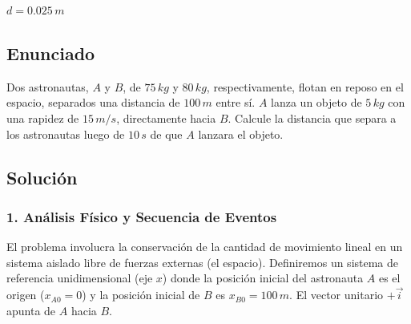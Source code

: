 \documentclass[12pt, a4paper]{article}
\begin{document}
\begin{tcolorbox}[colback=green!5!white, colframe=green!50!black, title=Respuesta Final]
\centering \Large $d = 0.025 \, \si{m}$
\end{tcolorbox}

\newpage

\subsection*{Enunciado}
Dos astronautas, $A$ y $B$, de $75 \, \si{kg}$ y $80 \, \si{kg}$, respectivamente, flotan en reposo en el espacio, separados una distancia de $100 \, \si{m}$ entre sí. $A$ lanza un objeto de $5 \, \si{kg}$ con una rapidez de $15 \, \si{m/s}$, directamente hacia $B$. Calcule la distancia que separa a los astronautas luego de $10 \, \si{s}$ de que $A$ lanzara el objeto.

\begin{center}
\end{center}

\subsection*{Solución}

\subsubsection*{1. Análisis Físico y Secuencia de Eventos}
El problema involucra la conservación de la cantidad de movimiento lineal en un sistema aislado libre de fuerzas externas (el espacio). Definiremos un sistema de referencia unidimensional (eje $x$) donde la posición inicial del astronauta $A$ es el origen ($x_{A0} = 0$) y la posición inicial de $B$ es $x_{B0} = 100 \, \si{m}$. El vector unitario $+\vec{i}$ apunta de $A$ hacia $B$.
\end{document}
